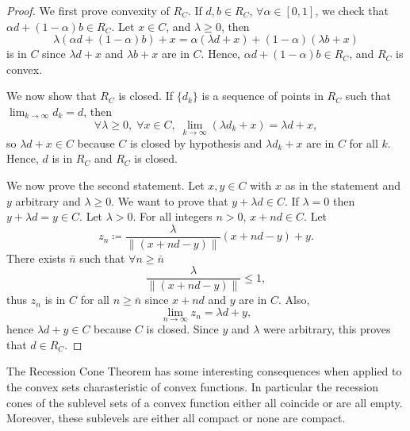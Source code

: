 \documentclass[11pt,a4paper,oneside,openany]{book}
\numberwithin{definition}{section}
\numberwithin{theorem}{section}
\numberwithin{problem}{section}
\begin{document}
\begin{proof}
    We first prove convexity of $R_C$. If \( d, b \in R_C \), \( \forall \alpha \in [0,1] \), we check that \( \alpha d + (1- \alpha)b \in R_C \). Let \(  x \in C \), and \(  \lambda \geq 0 \), then 
    \[ \lambda (\alpha d + (1- \alpha)b) + x = \alpha (\lambda d + x) + (1- \alpha) (\lambda b + x) \]
    is in $C$ since \( \lambda d + x \) and \( \lambda b + x \) are in \( C \). Hence, \( \alpha d + (1- \alpha)b \in R_C \), and \( R_C \) is convex. 

    We now show that $R_C$ is closed. If \( \{ d_k \} \) is a sequence of points in \( R_C \) such that \( \lim_{k \to \infty} d_k = d \), then 
    \[ \forall \lambda \geq 0, \; \forall x \in C, \; \lim_{k \to \infty} (\lambda d_k + x) = \lambda d + x, \]
    so \( \lambda d + x \in C \) because \( C \) is closed by hypothesis and \( \lambda d_k +x \) are in $C$ for all $k$. Hence, \( d \) is in \( R_C \) and \( R_C \) is closed.

    We now prove the second statement. Let \( x,y \in C \) with $x$ as in the statement and $y$ arbitrary and \( \lambda \geq 0 \). We want to prove that \( y + \lambda d \in C \). If \( \lambda = 0 \) then \( y + \lambda d = y \in C \). Let \( \lambda > 0 \). For all integers \( n > 0 \), \( x + n d \in C \). Let 
    \[ z_n \coloneqq \frac{\lambda}{\| (x + nd - y) \|} (x + nd - y) + y. \]
    There exists \( \bar{n} \) such that \( \forall n \geq \bar{n} \) 
    \[ \frac{\lambda}{\| (x + nd - y) \|} \leq 1, \]
    thus \( z_n \) is in \( C \) for all $n \geq \bar n$ since $x + nd$ and $y$ are in $C$. Also, 
    \[ \lim_{n \to \infty} z_n = \lambda d + y, \]
    hence \( \lambda d + y \in C \) because \( C \) is closed. Since \( y \) and \( \lambda \) were arbitrary, this proves that \( d \in R_C \).
\end{proof}

The Recession Cone Theorem has some interesting consequences when applied to the convex sets charasteristic of convex functions. In particular the recession cones of the sublevel sets of a convex function either all coincide or are all empty. Moreover, these sublevels are either all compact or none are compact.
\end{document}
